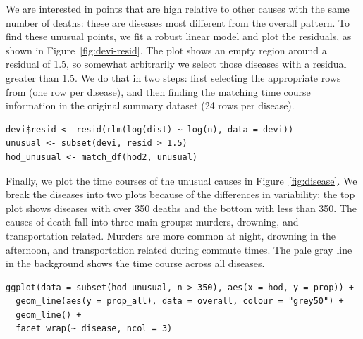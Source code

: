 \documentclass[article]{jss}
\begin{document}
We are interested in points that are high relative to other causes with the same number of deaths: these are diseases most different from the overall pattern. To find these unusual points, we fit a robust linear model and plot the residuals, as shown in Figure~\ref{fig:devi-resid}. The plot shows an empty region around a residual of 1.5, so somewhat arbitrarily we select those diseases with a residual greater than 1.5. We do that in two steps: first selecting the appropriate rows from  (one row per disease), and then finding the matching time course information in the original summary dataset (24 rows per disease).

\begin{Verbatim}
devi$resid <- resid(rlm(log(dist) ~ log(n), data = devi))
unusual <- subset(devi, resid > 1.5)
hod_unusual <- match_df(hod2, unusual)
\end{Verbatim}

Finally, we plot the time courses of the unusual causes in Figure~\ref{fig:disease}. We break the diseases into two plots because of the differences in variability: the top plot shows diseases with over 350 deaths and the bottom with less than 350. The causes of death fall into three main groups: murders, drowning, and transportation related. Murders are more common at night, drowning in the afternoon, and transportation related during commute times. The pale gray line in the background shows the time course across all diseases.

\begin{Verbatim}
ggplot(data = subset(hod_unusual, n > 350), aes(x = hod, y = prop)) + 
  geom_line(aes(y = prop_all), data = overall, colour = "grey50") +
  geom_line() + 
  facet_wrap(~ disease, ncol = 3)
\end{Verbatim}
\end{document}
